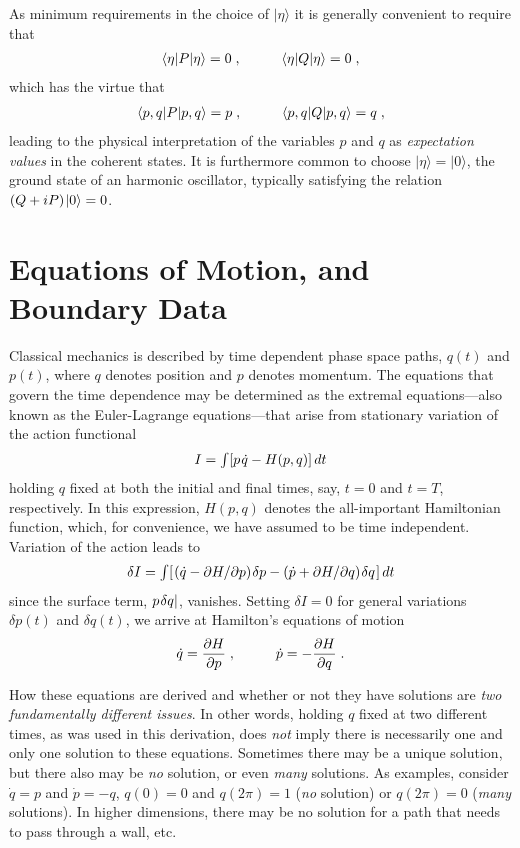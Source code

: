 \documentclass[12pt]{article}
\def\tint{{\textstyle\int}}
\def\s{\hskip.08em}
\def\d{\partial}
\def\bn{\begin{eqnarray}}     %
\def\en{\end{eqnarray}}       %
\def\<{\langle}
\def\>{\rangle}
\begin{document}
As minimum requirements in the choice of $|\eta\>$ it is generally 
convenient to require that
  \bn  \<\eta|P|\eta\>=0\;,\hskip1cm \<\eta|Q|\eta\>=0\;,  \label{h5}\en
which has the virtue that
  \bn  \<p,q|P|p,q\>=p\;,\hskip1cm \<p,q|Q|p,q\>=q\;, \en
leading to the physical interpretation of the variables $p$ and $q$ as 
{\it expectation values} in the coherent states. It is furthermore common 
to choose $|\eta\>=|0\>$, the ground state of an harmonic oscillator, 
typically satisfying the relation $(Q+iP)\s|0\>=0$. 

\section{Equations of Motion, and Boundary Data}
Classical mechanics is described by time dependent phase space paths, $q(t)$ 
and $p(t)$, where $q$ denotes position and $p$ denotes momentum. The 
equations that govern the time dependence may be determined as the 
extremal equations---also known as the Euler-Lagrange equations---that 
arise from stationary variation of the action functional
  \bn I=\tint[p\s{\dot q}-H(p,q)]\,dt  \en
holding $q$ fixed at both the initial and final times, say, $t=0$ and 
$t=T$, respectively. In this expression, $H(p,q)$ denotes the all-important 
Hamiltonian function, which, for convenience, we have assumed to be time 
independent. Variation of the action leads to
  \bn \delta I=\tint[\s({\dot q}-\d H/\d p)\s\delta p-({\dot p}+
\d H/\d q)\s\delta q\s]\,dt  \en
since the surface term, $p\s\delta q|$, vanishes. Setting $\delta I=0$ 
for general variations $\delta p(t)$ and $\delta q(t)$, we arrive at 
Hamilton's equations of motion
 \bn {\dot q}=\frac{\d H}{\d p}\;,\hskip1cm{\dot p}=-\frac{\d H}{\d q}\;. \en

How these equations are derived and whether or not they have solutions are 
{\it two fundamentally different issues}. In other words, holding 
$q$ fixed at two different times, as was used in this derivation, does 
{\it not} imply there is necessarily one and only one solution to these 
equations. Sometimes there may be a unique solution, but there also may 
be {\it no} solution, or even {\it many} solutions. As examples, consider 
${\dot q}= p$ and ${\dot p}=-q$, $q(0)=0$ and $q(2\pi)=1$ 
({\it no} solution) or $q(2\pi)=0$ ({\it many} solutions). In higher 
dimensions, there may be no solution for a path that needs to pass through 
a wall, etc. 
\end{document}
